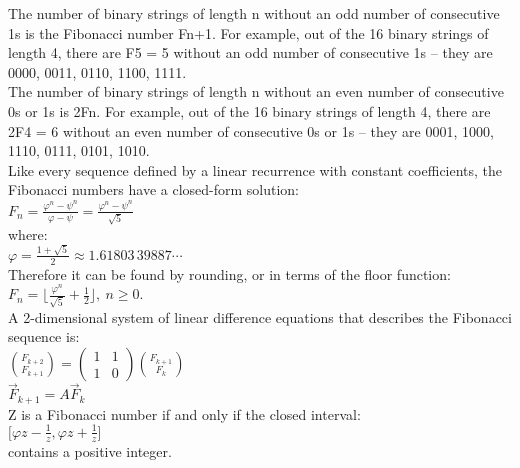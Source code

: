 \documentclass[10pt,letterpaper,twocolumn,twosided]{article}
\begin{document}
The number of binary strings of length n without an odd number of consecutive 1s is the Fibonacci number Fn+1. For example, out of the 16 binary strings of length 4, there are F5 = 5 without an odd number of consecutive 1s – they are 0000, 0011, 0110, 1100, 1111.\\


The number of binary strings of length n without an even number of consecutive 0s or 1s is 2Fn. For example, out of the 16 binary strings of length 4, there are 2F4 = 6 without an even number of consecutive 0s or 1s – they are 0001, 1000, 1110, 0111, 0101, 1010.\\


Like every sequence defined by a linear recurrence with constant coefficients, the Fibonacci numbers have a closed-form solution:\\


$F_n = \frac{\varphi^n-\psi^n}{\varphi-\psi} = \frac{\varphi^n-\psi^n}{\sqrt 5}$\\


where:\\


$\varphi = \frac{1 + \sqrt{5}}{2} \approx 1.61803\,39887\cdots\,$\\


Therefore it can be found by rounding, or in terms of the floor function:\\


$F_n=\bigg\lfloor\frac{\varphi^n}{\sqrt 5} + \frac{1}{2}\bigg\rfloor,\ n \geq 0.$\\


A 2-dimensional system of linear difference equations that describes the Fibonacci sequence is:\\


${F_{k+2} \choose F_{k+1}} = \begin{pmatrix} 1 & 1 \\ 1 & 0 \end{pmatrix} {F_{k+1} \choose F_{k}}$\\

$\vec F_{k+1} = A \vec F_{k}$\\


Z is a Fibonacci number if and only if the closed interval:\\


$\bigg[\varphi z-\frac{1}{z},\varphi z+\frac{1}{z}\bigg]$\\


contains a positive integer.\\
\end{document}
